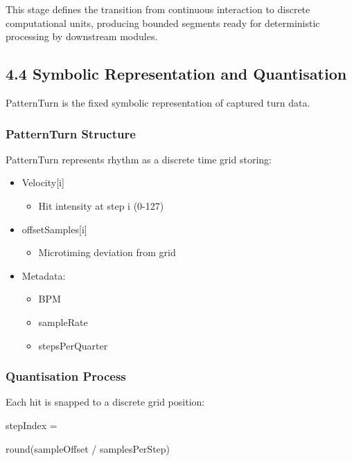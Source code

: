 This stage defines the transition from continuous interaction to
discrete computational units, producing bounded segments ready for
deterministic processing by downstream modules.

\subsection{4.4 Symbolic Representation and
Quantisation}\label{symbolic-representation-and-quantisation}

PatternTurn is the fixed symbolic representation of captured turn data.

\subsubsection{PatternTurn Structure}\label{patternturn-structure}

PatternTurn represents rhythm as a discrete time grid storing:

\begin{itemize}
\item
  Velocity{[}i{]}

  \begin{itemize}
  \item
    Hit intensity at step i (0-127)
  \end{itemize}
\item
  offsetSamples{[}i{]}

  \begin{itemize}
  \item
    Microtiming deviation from grid
  \end{itemize}
\item
  Metadata:

  \begin{itemize}
  \item
    BPM
  \item
    sampleRate
  \item
    stepsPerQuarter
  \end{itemize}
\end{itemize}

\subsubsection{Quantisation Process}\label{quantisation-process}

Each hit is snapped to a discrete grid position:

stepIndex =

round(sampleOffset / samplesPerStep)

